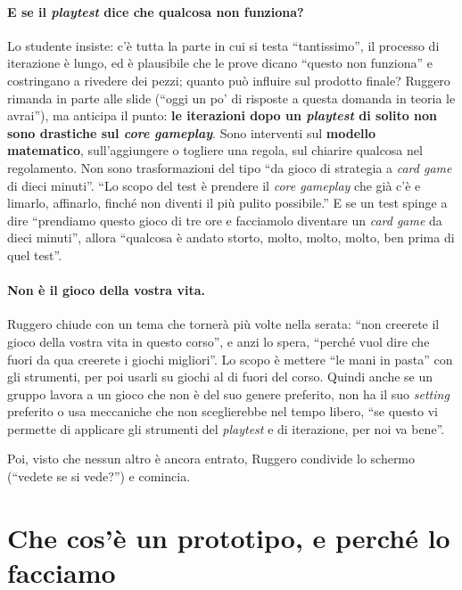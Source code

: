 \paragraph{E se il \emph{playtest} dice che qualcosa non funziona?} Lo studente insiste:
c'è tutta la parte in cui si testa ``tantissimo'', il processo di iterazione è lungo, ed
è plausibile che le prove dicano ``questo non funziona'' e costringano a rivedere dei
pezzi; quanto può influire sul prodotto finale? Ruggero rimanda in parte alle slide
(``oggi un po' di risposte a questa domanda in teoria le avrai''), ma anticipa il punto:
\textbf{le iterazioni dopo un \emph{playtest} di solito non sono drastiche sul
\emph{core gameplay}}. Sono interventi sul \textbf{modello matematico}, sull'aggiungere
o togliere una regola, sul chiarire qualcosa nel regolamento. Non sono trasformazioni del
tipo ``da gioco di strategia a \emph{card game} di dieci minuti''. ``Lo scopo del test è
prendere il \emph{core gameplay} che già c'è e limarlo, affinarlo, finché non diventi il
più pulito possibile.'' E se un test spinge a dire ``prendiamo questo gioco di tre ore e
facciamolo diventare un \emph{card game} da dieci minuti'', allora ``qualcosa è andato
storto, molto, molto, molto, ben prima di quel test''.

\paragraph{Non è il gioco della vostra vita.} Ruggero chiude con un tema che tornerà
più volte nella serata: ``non creerete il gioco della vostra vita in questo corso'', e
anzi lo spera, ``perché vuol dire che fuori da qua creerete i giochi migliori''. Lo
scopo è mettere ``le mani in pasta'' con gli strumenti, per poi usarli su giochi al di
fuori del corso. Quindi anche se un gruppo lavora a un gioco che non è del suo genere
preferito, non ha il suo \emph{setting} preferito o usa meccaniche che non sceglierebbe
nel tempo libero, ``se questo vi permette di applicare gli strumenti del \emph{playtest}
e di iterazione, per noi va bene''.

Poi, visto che nessun altro è ancora entrato, Ruggero condivide lo schermo (``vedete se
si vede?'') e comincia.

\section{Che cos'è un prototipo, e perché lo facciamo}
\label{a12:sec:prototipo}

